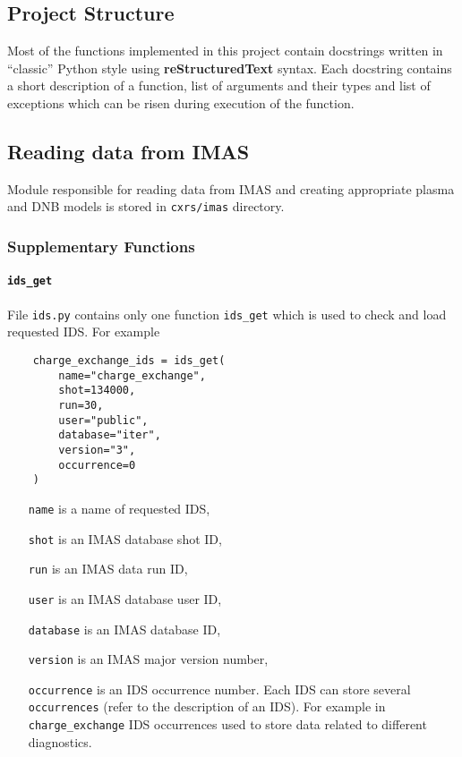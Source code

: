 \documentclass[../main.tex]{subfiles}
\begin{document}
\subsection{Project Structure}%
\label{sec:project_structure}

Most of the functions implemented in this project contain docstrings written in \enquote{classic} Python style using \textbf{reStructuredText} syntax. Each docstring contains a short description of a function, list of arguments and their types and list of exceptions which can be risen during execution of the function.

\subsection{Reading data from IMAS}%
\label{sec:reading_from_imas}

Module responsible for reading data from IMAS and creating appropriate plasma and DNB models is stored in \texttt{cxrs\//imas} directory.

\subsubsection{Supplementary Functions}%
\label{sec:imas_supp}

\paragraph{\texttt{ids\_get}}%
\label{par:ids_get}

File \texttt{ids.py} contains only one function \texttt{ids\_get} which is used to check and load requested IDS. For example

\begin{verbatim}
    charge_exchange_ids = ids_get(
        name="charge_exchange",
        shot=134000,
        run=30,
        user="public",
        database="iter",
        version="3",
        occurrence=0
    )
\end{verbatim}

\begin{itemize}[align=left]
    \item[\texttt{name}] is a name of requested IDS,
    \item[\texttt{shot}] is an IMAS database shot ID,
    \item[\texttt{run}] is an IMAS data run ID,
    \item[\texttt{user}] is an IMAS database user ID,
    \item[\texttt{database}] is an IMAS database ID,
    \item[\texttt{version}] is an IMAS major version number,
    \item[\texttt{occurrence}] is an IDS occurrence number. Each IDS can store several \texttt{occurrences} (refer to the description of an IDS). For example in \texttt{charge\_exchange} IDS occurrences used to store data related to different diagnostics.
\end{itemize}
\end{document}
